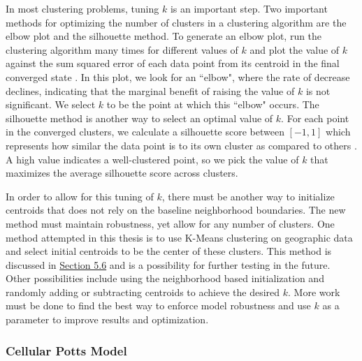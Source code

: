 \documentclass[times new roman,12pt]{article}
\begin{document}
In most clustering problems, tuning $k$ is an important step. Two important methods for optimizing the number of clusters in a clustering algorithm are the elbow plot and the silhouette method. To generate an elbow plot, run the clustering algorithm many times for different values of $k$ and plot the value of $k$ against the sum squared error of each data point from its centroid in the final converged state \cite{kodinariya2013review}. In this plot, we look for an ``elbow", where the rate of decrease declines, indicating that the marginal benefit of raising the value of $k$ is not significant. We select $k$ to be the point at which this ``elbow" occurs. The silhouette method is another way to select an optimal value of $k$. For each point in the converged clusters, we calculate a silhouette score between $[-1,1]$ which represents how similar the data point is to its own cluster as compared to others \cite{rousseeuw1987silhouettes}. A high value indicates a well-clustered point, so we pick the value of $k$ that maximizes the average silhouette score across clusters. 

In order to allow for this tuning of $k$, there must be another way to initialize centroids that does not rely on the baseline neighborhood boundaries. The new method must maintain robustness, yet allow for any number of clusters. One method attempted in this thesis is to use K-Means clustering on geographic data and select initial centroids to be the center of these clusters. This method is discussed in  \hyperref[repeatability]{Section 5.6} and is a possibility for further testing in the future. Other possibilities include using the neighborhood based initialization and randomly adding or subtracting centroids to achieve the desired $k$. More work must be done to find the best way to enforce model robustness and use $k$ as a parameter to improve results and optimization. 

\subsubsection{Cellular Potts Model}
\label{cpm}
\end{document}
